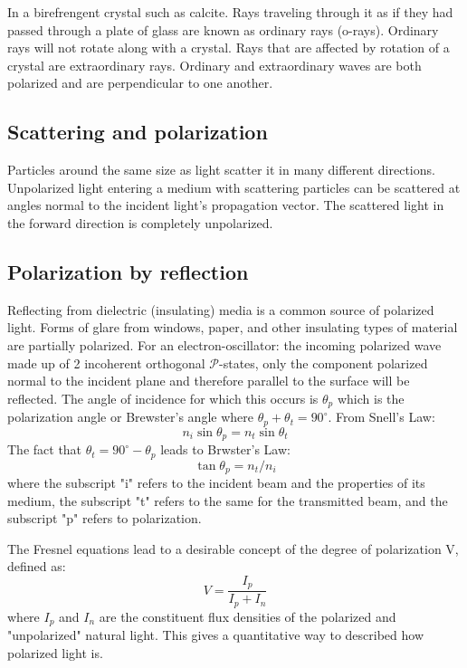 \documentclass[12pt]{report}
\begin{document}
In a birefrengent crystal such as calcite. Rays  traveling through it as if they had passed through a plate of glass are known as ordinary rays (o-rays). Ordinary rays will not rotate along with a crystal. Rays that are affected by rotation of a crystal are extraordinary rays. Ordinary and extraordinary waves are both polarized and are perpendicular to one another. 

\subsection{Scattering and polarization}
Particles around the same size as light scatter it in many different directions. Unpolarized light entering a medium with scattering particles can be scattered at angles normal to the incident light's propagation vector. The scattered light in the forward direction is completely unpolarized.  

\subsection{Polarization by reflection}
Reflecting from dielectric (insulating) media is a common source of polarized light. Forms of glare from windows, paper, and other insulating types of material are partially polarized. For an electron-oscillator: the incoming polarized wave made up of 2 incoherent orthogonal $\mathcal{P}$-states, only the component polarized normal to the incident plane and therefore parallel to the surface will be reflected. The angle of incidence for which this occurs is $\theta_p$ which is the polarization angle or Brewster's angle where $\theta_p+\theta_t=90^\circ$. From Snell's Law:
\begin{equation}
n_i \sin \theta_p = n_t \sin \theta_t
\end{equation}
The fact that $\theta_t = 90^\circ - \theta_p$ leads to Brwster's Law:
\begin{equation}
\tan \theta_p = n_t/n_i
\end{equation}
where the subscript "i" refers to the incident beam and the properties of its medium, the subscript "t" refers to the same for the transmitted beam, and the subscript "p" refers to polarization. 

The Fresnel equations lead to a desirable concept of the degree of polarization V, defined as:
\begin{equation}
V = \frac{I_p}{I_p+I_n}
\end{equation}
where $I_p$ and $I_n$ are the constituent flux densities of the polarized and "unpolarized" natural light. This gives a quantitative way to described how polarized light is. 
\end{document}
